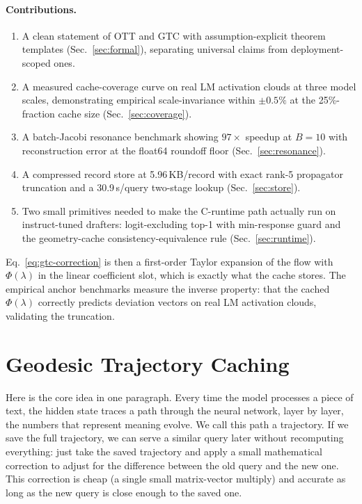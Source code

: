 \documentclass[11pt]{article}
\begin{document}
\paragraph{Contributions.}
\begin{enumerate}
  \item A clean statement of OTT and GTC with assumption-explicit theorem
        templates (Sec.~\ref{sec:formal}), separating universal claims from
        deployment-scoped ones.
  \item A measured cache-coverage curve on real LM activation clouds at three
        model scales, demonstrating empirical scale-invariance within
        $\pm 0.5\%$ at the 25\%-fraction cache size (Sec.~\ref{sec:coverage}).
  \item A batch-Jacobi resonance benchmark showing $97\times$ speedup at
        $B=10$ with reconstruction error at the float64 roundoff floor
        (Sec.~\ref{sec:resonance}).
  \item A compressed record store at 5.96\,KB/record with exact rank-5
        propagator truncation and a 30.9\,\textmu s/query two-stage lookup
        (Sec.~\ref{sec:store}).
  \item Two small primitives needed to make the C-runtime path actually run on
        instruct-tuned drafters: logit-excluding top-1 with min-response
        guard and the geometry-cache consistency-equivalence rule
        (Sec.~\ref{sec:runtime}).
\end{enumerate}



Eq.~\eqref{eq:gtc-correction} is then a first-order Taylor expansion of the
flow with $\Phi(\lambda)$ in the linear coefficient slot, which is exactly
what the cache stores.  The empirical anchor benchmarks measure the inverse
property: that the cached $\Phi(\lambda)$ correctly predicts deviation
vectors on real LM activation clouds, validating the truncation.

\section{Geodesic Trajectory Caching}
\label{sec:gtc}

Here is the core idea in one paragraph. Every time the model processes a piece
of text, the hidden state traces a path through the neural network, layer by
layer, the numbers that represent meaning evolve. We call this path a
trajectory. If we save the full trajectory, we can serve a similar
query later without recomputing everything: just take the saved trajectory and
apply a small mathematical correction to adjust for the difference between the
old query and the new one. This correction is cheap (a single small
matrix-vector multiply) and accurate as long as the new query is close enough
to the saved one.
\end{document}
